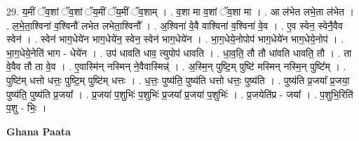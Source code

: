 \documentclass[17pt]{extarticle}
\begin{document}
29. य॒मीं ॅव॒शां ॅव॒शां ॅय॒मीं ॅय॒मीं ॅव॒शाम् । . व॒शा मा व॒शां ॅव॒शा मा । . आ ल॑भेत लभे॒ता ल॑भेत । . ल॒भे॒ता॒श्विना॑ व॒श्विनौ॑ लभेत लभेता॒श्विनौ᳚ । . अ॒श्विना॑ वे॒वै वाश्विना॑ व॒श्विना॑ वे॒व । . ए॒व स्वेन॒ स्वेनै॒वैव स्वेन॑ । . स्वेन॑ भाग॒धेये॑न भाग॒धेये॑न॒ स्वेन॒ स्वेन॑ भाग॒धेये॑न । . भा॒ग॒धेये॒नोपोप॑ भाग॒धेये॑न भाग॒धेये॒नोप॑ । . भा॒ग॒धेये॒नेति॑ भाग - धेये॑न । . उप॑ धावति धाव॒ त्युपोप॑ धावति । . धा॒व॒ति॒ तौ तौ धा॑वति धावति॒ तौ । . ता वे॒वैव तौ ता वे॒व । . ए॒वास्मि॑न् नस्मिन् ने॒वैवास्मिन्न्॑ । . अ॒स्मि॒न् पुष्टि॒म् पुष्टि॑ मस्मिन् नस्मि॒न् पुष्टि᳚म् । . पुष्टि॑म् धत्तो धत्तः॒ पुष्टि॒म् पुष्टि॑म् धत्तः । . ध॒त्तः॒ पुष्य॑ति॒ पुष्य॑ति धत्तो धत्तः॒ पुष्य॑ति । . पुष्य॑ति प्र॒जया᳚ प्र॒जया॒ पुष्य॑ति॒ पुष्य॑ति प्र॒जया᳚ । . प्र॒जया॑ प॒शुभिः॑ प॒शुभिः॑ प्र॒जया᳚ प्र॒जया॑ प॒शुभिः॑ । . प्र॒जयेति॑प्र - जया᳚ । . प॒शुभि॒रिति॑ प॒शु - भिः॒ । \newline

\textbf{Ghana Paata } \newline
\end{document}
